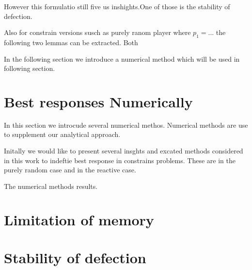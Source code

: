 \documentclass[10pt]{article}
\begin{document}
However this formulatio still five us inshights.One of those is the stability
of defection.

Also for constrain versions susch as purely ranom player where \(p_1= ...\)
the following two lemmas can be extracted. Both 

In the following section we introduce a numerical method which will be used in 
following section.

\section{Best responses Numerically}

In this section we introcude several numerical methos. Numerical methods are use
to supplement our analytical approach.

Initally we would like to present several insghts and excated methods considered
in this work to indeftie best response in constrains problems. These are
in the purely random case 
and in the reactive case.


The numerical methods
results.

\section{Limitation of memory}

\section{Stability of defection}



\end{document}
